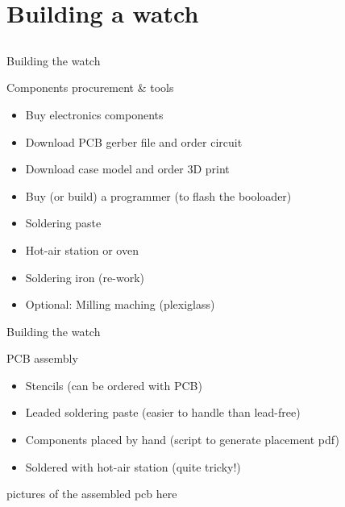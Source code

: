\documentclass[compress,red]{beamer}
\begin{document}
\section{Building a watch}

\subsection*{} %

\begin{frame}{Building the watch}

  Components procurement \& tools

  \begin{itemize}
  \item Buy electronics components
  \item Download PCB gerber file and order circuit
  \item Download case model and order 3D print
  \item Buy (or build) a programmer (to flash the booloader)
  \item Soldering paste
  \item Hot-air station or oven
  \item Soldering iron (re-work)
  \item Optional: Milling maching (plexiglass)
  \end{itemize}


\end{frame}

\begin{frame}{Building the watch}

  PCB assembly

  \begin{itemize}
  \item Stencils (can be ordered with PCB)
  \item Leaded soldering paste (easier to handle than lead-free)
  \item Components placed by hand (script to generate placement pdf)
  \item Soldered with hot-air station (quite tricky!)
  \end{itemize}

  \begin{center}
    pictures of the assembled pcb here
  \end{center}


\end{frame}
\end{document}
